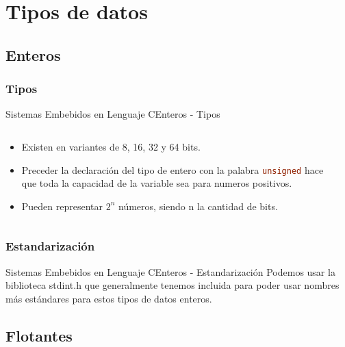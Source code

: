 \documentclass[aspectratio=169, xcolor=dvipsnames]{beamer}
\begin{document}
\section{Tipos de datos}
\subsection{Enteros}
\subsubsection{Tipos}
\begin{frame}{Sistemas Embebidos en Lenguaje C}{Enteros - Tipos}
\begin{columns}
    \begin{column}{0.5\textwidth}
    \begin{itemize}
        \item Existen en variantes de 8, 16, 32 y 64 bits.
        \item Preceder la declaración del tipo de entero con la palabra \lstinline[language=c]{unsigned} hace que toda la capacidad de la variable sea para numeros positivos.
        \item Pueden representar $2^n$ números, siendo n la cantidad de bits.
    \end{itemize}
    \end{column}
    \begin{column}{0.5\textwidth}
        
    \end{column}
\end{columns}
\end{frame}

\subsubsection{Estandarización}
\begin{frame}{Sistemas Embebidos en Lenguaje C}{Enteros - Estandarización}
    Podemos usar la biblioteca \textcolor{myblue}{stdint.h} que generalmente tenemos incluida para poder usar nombres más estándares para estos tipos de datos enteros.
    
\end{frame}

\subsection{Flotantes}
\end{document}
